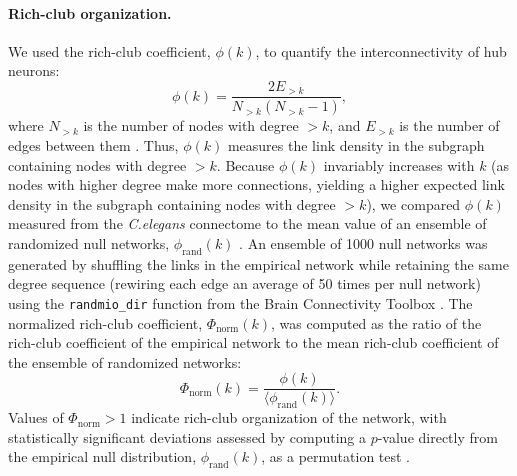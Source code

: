 \paragraph{Rich-club organization.}
We used the rich-club coefficient, $\phi(k)$, to quantify the interconnectivity of hub neurons:
\begin{equation}
    \label{eqn:rich_club}
    \phi(k) = \frac{2E_{>k}}{N_{>k}(N_{>k}-1)},
\end{equation}
where $N_{>k}$ is the number of nodes with degree $>k$, and $E_{>k}$ is the number of edges between them \citep{Colizza2006}.
Thus, $\phi(k)$ measures the link density in the subgraph containing nodes with degree $>k$.
Because $\phi(k)$ invariably increases with $k$ (as nodes with higher degree make more connections, yielding a higher expected link density in the subgraph containing nodes with degree $>k$), we compared $\phi(k)$ measured from the \emph{C.elegans} connectome to the mean value of an ensemble of randomized null networks, $\phi_\mathrm{rand}(k)$ \citep{Colizza2006}.
An ensemble of 1000 null networks was generated by shuffling the links in the empirical network while retaining the same degree sequence \citep{Maslov2002} (rewiring each edge an average of 50 times per null network) using the \texttt{randmio\_dir} function from the Brain Connectivity Toolbox \citep{Rubinov2010}.
The normalized rich-club coefficient, $\Phi_\mathrm{norm}(k)$, was computed as the ratio of the rich-club coefficient of the empirical network to the mean rich-club coefficient of the ensemble of randomized networks:
\begin{equation}
    \label{eqn:rich_club_norm}
    \Phi_\mathrm{norm}(k) = \frac{\phi(k)}{\langle \phi_\mathrm{rand}(k) \rangle}.
\end{equation}
Values of $\Phi_\mathrm{norm} > 1$ indicate rich-club organization of the network, with statistically significant deviations assessed by computing a $p$-value directly from the empirical null distribution, $\phi_\mathrm{rand}(k)$, as a permutation test \citep{VandenHeuvel2011}.

